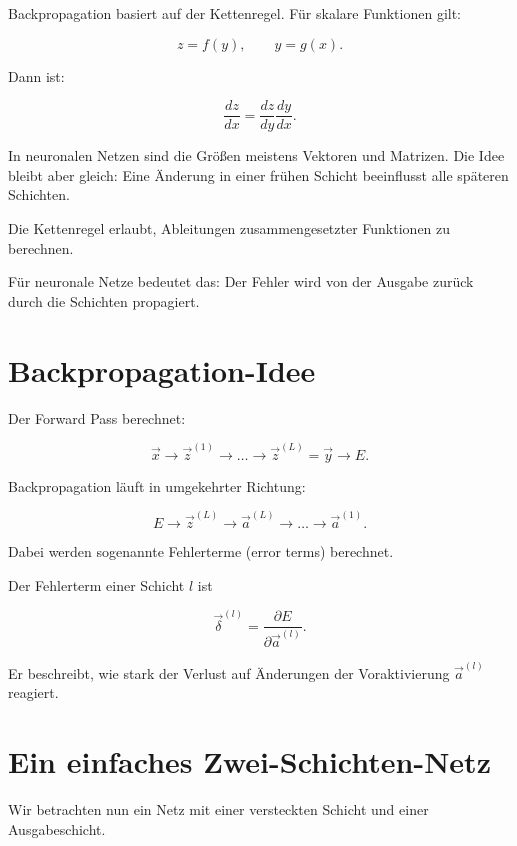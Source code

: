 Backpropagation basiert auf der Kettenregel.
Für skalare Funktionen gilt:

\[
    z = f(y),
    \qquad
    y = g(x).
\]

Dann ist:

\[
    \frac{dz}{dx}
    =
    \frac{dz}{dy}
    \frac{dy}{dx}.
\]

In neuronalen Netzen sind die Größen meistens Vektoren und Matrizen.
Die Idee bleibt aber gleich:
Eine Änderung in einer frühen Schicht beeinflusst alle späteren Schichten.

\begin{definitionbox}
Die Kettenregel erlaubt, Ableitungen zusammengesetzter Funktionen zu berechnen.

Für neuronale Netze bedeutet das:
Der Fehler wird von der Ausgabe zurück durch die Schichten propagiert.
\end{definitionbox}

\section{Backpropagation-Idee}

Der Forward Pass berechnet:

\[
    \vec{x}
    \longrightarrow
    \vec{z}^{(1)}
    \longrightarrow
    \dots
    \longrightarrow
    \vec{z}^{(L)}
    =
    \vec{y}
    \longrightarrow
    E.
\]

Backpropagation läuft in umgekehrter Richtung:

\[
    E
    \longrightarrow
    \vec{z}^{(L)}
    \longrightarrow
    \vec{a}^{(L)}
    \longrightarrow
    \dots
    \longrightarrow
    \vec{a}^{(1)}.
\]

Dabei werden sogenannte Fehlerterme (error terms) berechnet.

\begin{definitionbox}
Der Fehlerterm einer Schicht \(l\) ist

\[
    \vec{\delta}^{(l)}
    =
    \frac{\partial E}{\partial \vec{a}^{(l)}}.
\]

Er beschreibt, wie stark der Verlust auf Änderungen der Voraktivierung \(\vec{a}^{(l)}\) reagiert.
\end{definitionbox}

\section{Ein einfaches Zwei-Schichten-Netz}

Wir betrachten nun ein Netz mit einer versteckten Schicht und einer Ausgabeschicht.

